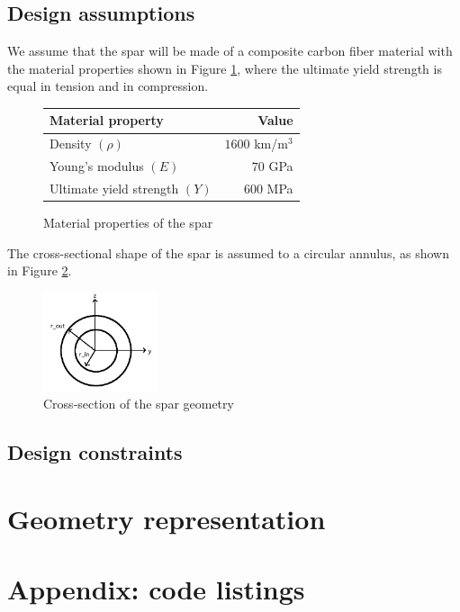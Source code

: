 \documentclass[11pt]{article}
\begin{document}
\subsection{Design assumptions}

We assume that the spar will be made of a composite
carbon fiber material with the material properties
shown in Figure \ref{fig:materials},
where the ultimate yield strength is equal in tension
and in compression.

\begin{figure}[hbt]
\centering
\begin{tabular}{ | l | r  |}
\hline
Material property & Value \\ \hline
Density $(\rho)$ & $1600$ km/m$^3$ \\ \hline
Young's modulus $(E)$ & $70$ GPa \\ \hline
Ultimate yield strength $(Y)$ & $600$ MPa \\ \hline
\end{tabular}
\caption{Material properties of the spar}
\label{fig:materials}
\end{figure}

The cross-sectional shape of the spar is assumed to a
circular annulus, as shown in Figure \ref{fig:section}.

\begin{figure}[hbt]
\centering
\includegraphics[width=0.3\textwidth]{annulus}
\caption{Cross-section of the spar geometry}
\label{fig:section}
\end{figure}

\subsection{Design constraints}

\section{Geometry representation}

\newpage

\section{Appendix: code listings}





\newpage


\end{document}
